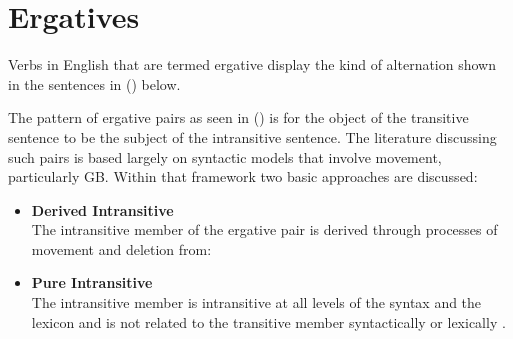 \chapter{Ergatives}
\label{ergatives}

Verbs in English that are termed ergative display the kind of
alternation shown in the sentences in () below.


The pattern of ergative pairs as seen in () is for the object of the
transitive sentence to be the subject of the intransitive sentence.
The literature discussing such pairs is based largely on syntactic
models that involve movement, particularly GB.  Within that framework
two basic approaches are discussed:

\begin{itemize}
\item {\bf Derived Intransitive}\\ The intransitive member of the
ergative pair is derived through processes of movement and deletion from:
\begin{itemize}
\item a transitive D-structure \cite{Burzio86); or	
\item transitive lexical structure \cite{HaleKeyser86,HaleKeyser87}
\end{itemize}

\item {\bf Pure Intransitive}\\ The intransitive member is intransitive at all levels of the
syntax and the lexicon and is not related to the transitive member
syntactically or lexically \cite{Napoli88}.
\end{itemize}


